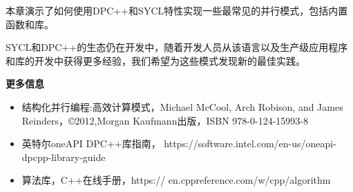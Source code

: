

本章演示了如何使用DPC++和SYCL特性实现一些最常见的并行模式，包括内置函数和库。\par

SYCL和DPC++的生态仍在开发中，随着开发人员从该语言以及生产级应用程序和库的开发中获得更多经验，我们希望为这些模式发现新的最佳实践。\par


\hspace*{\fill} \par %
\textbf{更多信息}

\begin{itemize}
	\item 结构化并行编程:高效计算模式，Michael McCool, Arch Robison, and James Reinders，©2012,Morgan Kaufmann出版，ISBN 978-0-124-15993-8
	\item 英特尔oneAPI DPC++库指南， https://software.intel.com/en-us/oneapi-dpcpp-library-guide
	\item 算法库，C++在线手册，https://	en.cppreference.com/w/cpp/algorithm
\end{itemize}









\newpage